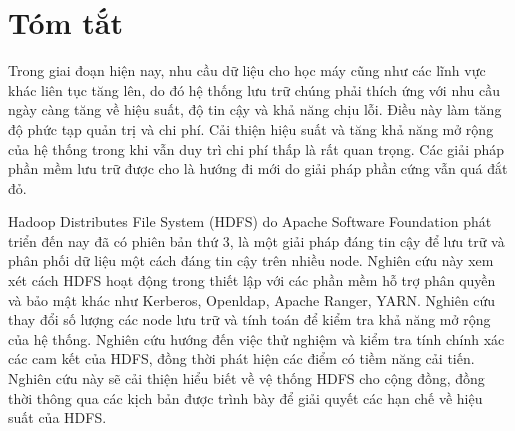 \section{Tóm tắt}

Trong giai đoạn hiện nay, nhu cầu dữ liệu cho học máy cũng như các lĩnh vực khác liên tục tăng lên, do đó hệ thống lưu trữ chúng phải thích ứng với nhu cầu ngày càng tăng về hiệu suất, độ tin cậy và khả năng chịu lỗi. Điều này làm tăng độ phức tạp quản trị và chi phí. Cải thiện hiệu suất và tăng khả năng mở rộng của hệ thống trong khi vẫn duy trì chi phí thấp là rất quan trọng. Các giải pháp phần mềm lưu trữ được cho là hướng đi mới do giải pháp phần cứng vẫn quá đắt đỏ. 

Hadoop Distributes File System (HDFS) do  Apache Software Foundation phát triển đến nay đã có phiên bản thứ 3, là một giải pháp đáng tin cậy để lưu trữ và phân phối dữ liệu một cách đáng tin cậy trên nhiều node. Nghiên cứu này xem xét cách HDFS hoạt động trong thiết lập với các phần mềm hỗ trợ phân quyền và bảo mật khác như Kerberos, Openldap, Apache Ranger, YARN. Nghiên cứu thay đổi số lượng các node lưu trữ và tính toán để kiểm tra khả năng mở rộng của hệ thống. Nghiên cứu hướng đến việc thử nghiệm và kiểm tra tính chính xác các cam kết của HDFS, đồng thời phát hiện các điểm có tiềm năng cải tiến. Nghiên cứu này sẽ cải thiện hiểu biết về vệ thống HDFS cho cộng đồng, đồng thời thông qua các kịch bản được trình bày để giải quyết các hạn chế về hiệu suất của HDFS.
